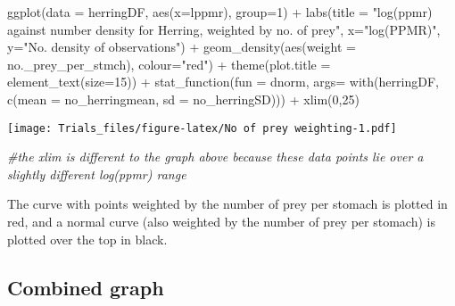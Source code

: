 \documentclass[
]{article}
\newenvironment{Shaded}{\begin{snugshade}}{\end{snugshade}}
\newcommand{\AttributeTok}[1]{\textcolor[rgb]{0.77,0.63,0.00}{#1}}
\newcommand{\CommentTok}[1]{\textcolor[rgb]{0.56,0.35,0.01}{\textit{#1}}}
\newcommand{\DecValTok}[1]{\textcolor[rgb]{0.00,0.00,0.81}{#1}}
\newcommand{\FunctionTok}[1]{\textcolor[rgb]{0.00,0.00,0.00}{#1}}
\newcommand{\NormalTok}[1]{#1}
\newcommand{\SpecialCharTok}[1]{\textcolor[rgb]{0.00,0.00,0.00}{#1}}
\newcommand{\StringTok}[1]{\textcolor[rgb]{0.31,0.60,0.02}{#1}}
\begin{document}
\begin{Shaded}
\begin{Highlighting}[]
\FunctionTok{ggplot}\NormalTok{(}\AttributeTok{data =}\NormalTok{ herringDF, }\FunctionTok{aes}\NormalTok{(}\AttributeTok{x=}\NormalTok{lppmr), }\AttributeTok{group=}\DecValTok{1}\NormalTok{) }\SpecialCharTok{+} 
          \FunctionTok{labs}\NormalTok{(}\AttributeTok{title =} \StringTok{"log(ppmr) against number density for Herring, weighted by no. of prey"}\NormalTok{,}
               \AttributeTok{x=}\StringTok{"log(PPMR)"}\NormalTok{, }\AttributeTok{y=}\StringTok{"No. density of observations"}\NormalTok{) }\SpecialCharTok{+}
          \FunctionTok{geom\_density}\NormalTok{(}\FunctionTok{aes}\NormalTok{(}\AttributeTok{weight =}\NormalTok{ no.\_prey\_per\_stmch), }\AttributeTok{colour=}\StringTok{"red"}\NormalTok{) }\SpecialCharTok{+} 
          \FunctionTok{theme}\NormalTok{(}\AttributeTok{plot.title =} \FunctionTok{element\_text}\NormalTok{(}\AttributeTok{size=}\DecValTok{15}\NormalTok{)) }\SpecialCharTok{+}
          \FunctionTok{stat\_function}\NormalTok{(}\AttributeTok{fun =}\NormalTok{ dnorm, }\AttributeTok{args=} \FunctionTok{with}\NormalTok{(herringDF, }\FunctionTok{c}\NormalTok{(}\AttributeTok{mean =}\NormalTok{ no\_herringmean, }\AttributeTok{sd =}\NormalTok{ no\_herringSD))) }\SpecialCharTok{+}
          \FunctionTok{xlim}\NormalTok{(}\DecValTok{0}\NormalTok{,}\DecValTok{25}\NormalTok{)}
\end{Highlighting}
\end{Shaded}

\texttt{[image: Trials\_files/figure-latex/No of prey weighting-1.pdf]}

\begin{Shaded}
\begin{Highlighting}[]
\CommentTok{\#the xlim is different to the graph above because these data points lie over a slightly different log(ppmr) range}
\end{Highlighting}
\end{Shaded}

The curve with points weighted by the number of prey per stomach is
plotted in red, and a normal curve (also weighted by the number of prey
per stomach) is plotted over the top in black.

\hypertarget{combined-graph}{%
\subsection{Combined graph}\label{combined-graph}}
\end{document}
